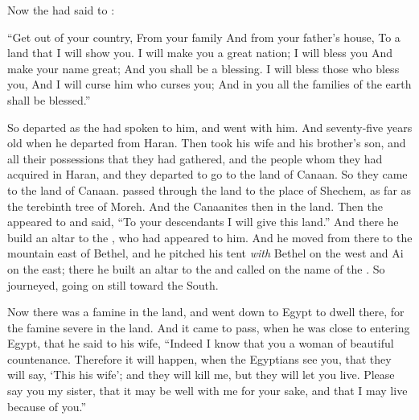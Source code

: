 
\bverse Now the \lord had said to :
\begin{bquotation}
``Get out of your country, From your family And from your father's house, To a land that I will show you. \bverse I will make you a great nation; I will bless you And make your name great; And you shall be a blessing. \bverse I will bless those who bless you, And I will curse him who curses you; And in you all the families of the earth shall be blessed.''
\end{bquotation}

\bverse So  departed as the \lord had spoken to him, and  went with him. And  \was seventy-five years old when he departed from Haran.
\bverse Then  took  his wife and  his brother's son, and all their possessions that they had gathered, and the people whom they had acquired in Haran, and they departed to go to the land of Canaan. So they came to the land of Canaan.
\bverse {} passed through the land to the place of Shechem, as far as the terebinth tree of Moreh. And the Canaanites \were then in the land.
\bverse Then the \lord appeared to  and said, ``To your descendants I will give this land.'' And there he build an altar to the \lord, who had appeared to him.
\bverse And he moved from there to the mountain east of Bethel, and he pitched his tent \textit{with} Bethel on the west and Ai on the east; there he built an altar to the \lord and called on the name of the \lord.
\bverse So  journeyed, going on still toward the South.


\bverse Now there was a famine in the land, and  went down to Egypt to dwell there, for the famine \was severe in the land.
\bverse And it came to pass, when he was close to entering Egypt, that he said to  his wife, ``Indeed I know that you \are a woman of beautiful countenance.
\bverse Therefore it will happen, when the Egyptians see you, that they will say, `This \is his wife'; and they will kill me, but they will let you live.
\bverse Please say you \are my sister, that it may be well with me for your sake, and that I may live because of you.''


